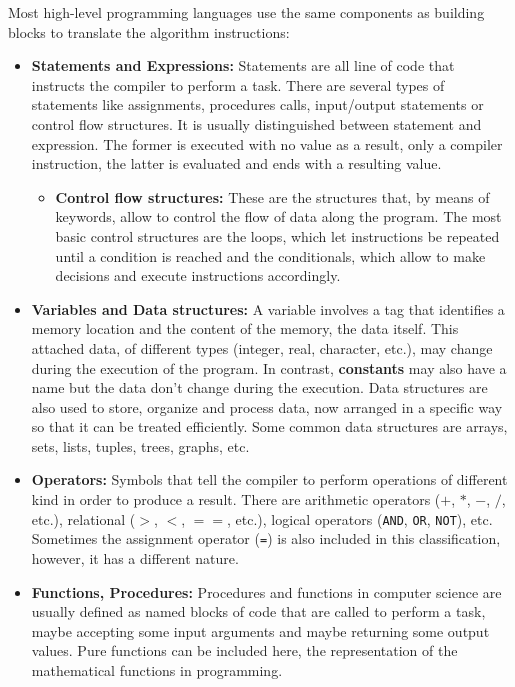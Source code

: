  
 \newpage
Most high-level programming languages use the same components as building blocks to translate the algorithm instructions:
\begin{itemize}[noitemsep]
    \item \textbf{Statements and Expressions:} Statements are all line of code that instructs the compiler to perform a task.
    There are several types of statements like assignments, procedures calls, input/output statements or control flow structures. 
    It is usually distinguished between statement and expression. 
    The former is executed with no value as a result, only a compiler instruction, 
    the latter is evaluated and ends with a resulting value.
    \begin{itemize}
        \item \textbf{Control flow structures:} These are the structures that, by means of keywords, allow to control the flow of data along the program. 
        The most basic control structures are the loops, which let instructions be repeated until a condition is reached and 
        the conditionals, which allow to make decisions and execute instructions accordingly.  
    \end{itemize}
    
    \item \textbf{Variables and Data structures:} A variable involves a tag that identifies a memory location and 
    the content of the memory, the data itself. 
    This attached data, of different types (integer, real, character, etc.), may change during the execution of the program.
    In contrast, \textbf{constants} may also have a name but the data don't change during the execution.
    Data structures are also used to store, organize and process data, 
    now arranged in a specific way so that it can be treated efficiently. 
    Some common data structures are arrays, sets, lists, tuples, trees, graphs, etc.
    
    \item \textbf{Operators:} Symbols that tell the compiler to perform operations of different kind in order to produce a result.
    There are arithmetic operators ($+$, $*$, $-$, $/$, etc.), 
    relational ($>$, $<$, $==$, etc.), 
    logical operators (\texttt{AND}, \texttt{OR}, \texttt{NOT}), etc. 
    Sometimes the assignment operator (\texttt{=}) is also included in this classification, 
    however, it has a different nature. 
    
    \item \textbf{Functions, Procedures:} Procedures and functions in computer science are usually defined as 
    named blocks of code that are called to perform a task, maybe accepting some input arguments and maybe returning some output values. 
    Pure functions can be included here, the representation of the mathematical functions in programming. 
    

\end{itemize}
